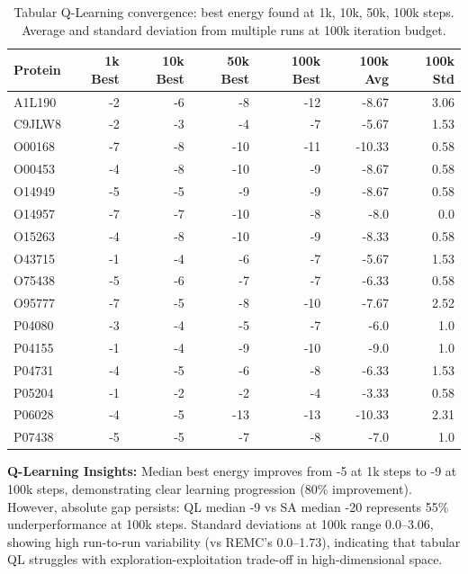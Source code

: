 \begin{table}[!htbp]
\centering
\caption[Tabular Q-Learning convergence benchmark]{Tabular Q-Learning convergence: best energy found at 1k, 10k, 50k, 100k steps. Average and standard deviation from multiple runs at 100k iteration budget.}
\label{tab:ql_convergence_enhanced}
\small
\begin{tabular}{lrrrrrr}
\hline
\textbf{Protein} & \textbf{1k Best} & \textbf{10k Best} & \textbf{50k Best} & \textbf{100k Best} & \textbf{100k Avg} & \textbf{100k Std} \\
\hline
A1L190 & -2 & -6 & -8 & -12 & -8.67 & 3.06 \\
C9JLW8 & -2 & -3 & -4 & -7 & -5.67 & 1.53 \\
O00168 & -7 & -8 & -10 & -11 & -10.33 & 0.58 \\
O00453 & -4 & -8 & -10 & -9 & -8.67 & 0.58 \\
O14949 & -5 & -5 & -9 & -9 & -8.67 & 0.58 \\
O14957 & -7 & -7 & -10 & -8 & -8.0 & 0.0 \\
O15263 & -4 & -8 & -10 & -9 & -8.33 & 0.58 \\
O43715 & -1 & -4 & -6 & -7 & -5.67 & 1.53 \\
O75438 & -5 & -6 & -7 & -7 & -6.33 & 0.58 \\
O95777 & -7 & -5 & -8 & -10 & -7.67 & 2.52 \\
P04080 & -3 & -4 & -5 & -7 & -6.0 & 1.0 \\
P04155 & -1 & -4 & -9 & -10 & -9.0 & 1.0 \\
P04731 & -4 & -5 & -6 & -8 & -6.33 & 1.53 \\
P05204 & -1 & -2 & -2 & -4 & -3.33 & 0.58 \\
P06028 & -4 & -5 & -13 & -13 & -10.33 & 2.31 \\
P07438 & -5 & -5 & -7 & -8 & -7.0 & 1.0 \\
\hline
\end{tabular}
\end{table}
\FloatBarrier

\textbf{Q-Learning Insights:} Median best energy improves from -5 at 1k steps to -9 at 100k steps, demonstrating clear learning progression (80\% improvement). However, absolute gap persists: QL median -9 vs SA median -20 represents 55\% underperformance at 100k steps. Standard deviations at 100k range 0.0--3.06, showing high run-to-run variability (vs REMC's 0.0--1.73), indicating that tabular QL struggles with exploration-exploitation trade-off in high-dimensional space. 

